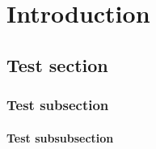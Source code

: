 \chapter{Introduction}
\section{Test section}
\lipsum[1]
\subsection{Test subsection}
\lipsum[1]
\subsubsection{Test subsubsection}
\lipsum[1-10]
